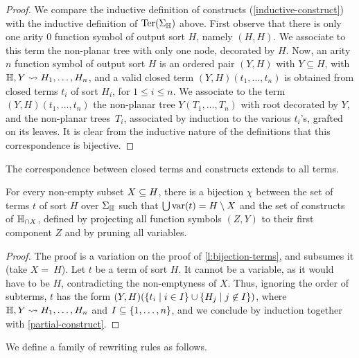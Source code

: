 \begin{proof}
  We compare the inductive definition of constructs (\cref{inductive-construct}) with the inductive definition of $\mathrm{Ter}(\Sigma_{\mathbb H})$ above.
  First observe that there is only one arity $0$ function symbol of output sort $H$, namely  $(H,H)$. 
  We associate to this term the non-planar tree with only one node, decorated by $H$.
  Now, an arity $n$ function symbol of output sort $H$ is an ordered pair $(Y,H)$ with $Y \subseteq H$, with
  ${\mathbb H},Y \leadsto H_1,\ldots,H_n$, and a valid closed term $(Y,H)(t_1,\ldots,t_n)$ is obtained from closed terms $t_i$ of  sort $H_i$, for $1 \leq i \leq n$. 
  We associate to the term $(Y,H)(t_1,\ldots,t_n)$ the non-planar tree $Y(T_1,\ldots,T_n)$ with root decorated by $Y$, and the non-planar trees~$T_i$, associated by induction to the various $t_i$'s, grafted on its leaves.
  It is clear from the inductive nature of the definitions that this correspondence is bijective.
\end{proof}

The correspondence between closed terms and constructs extends to all terms.

\begin{lemma} 
  \label{l:bijection-open}
  For every non-empty subset $X\subseteq H$,
 there is a bijection $\chi$ between the set of  terms $t$ of  sort $H$ over $\Sigma_{\mathbb H}$  such that $\bigcup \mathrm{var}(t)=H\setminus X$ and the set of constructs of ${\mathbb H}_{\cap X}$, 
 defined by projecting all function symbols $(Z,Y)$ to their first component $Z$ and by pruning all variables.
\end{lemma}

\begin{proof}
The proof is a variation on the proof of \cref{l:bijection-terms}, and subsumes it (take $X=~H$).  
Let $t$ be a term  of  sort $H$. 
It cannot be a variable, as it would have to be $H$, contradicting the non-emptyness of $X$. 
Thus, ignoring the order of subterms, $t$ has the form $(Y,H)(\left\{t_i \mid i\in I\right\}\cup\left\{H_j \mid j\not\in I\right\})$, where ${\mathbb H},Y \leadsto H_1,\ldots,H_n$ and $I\subseteq\left\{1,\ldots,n\right\}$, and we conclude by induction together with \cref{partial-construct}.
\end{proof}

We define a family of rewriting rules as follows.

